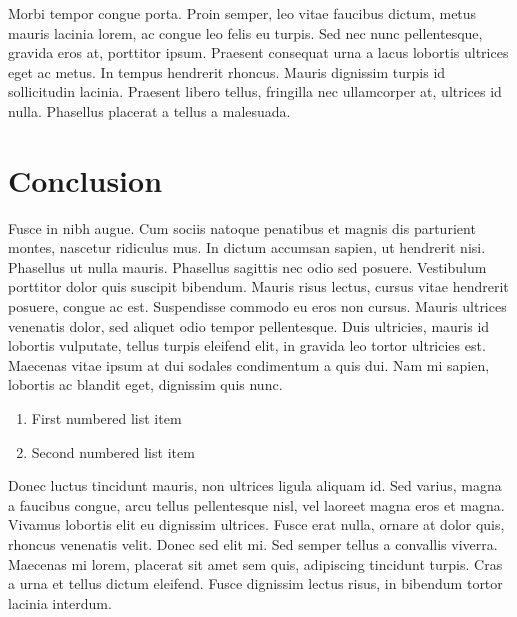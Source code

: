 \documentclass[a4paper,11pt]{article}
\begin{document}
Morbi tempor congue porta. Proin semper, leo vitae faucibus dictum, metus mauris lacinia lorem, ac congue leo felis eu turpis. Sed nec nunc pellentesque, gravida eros at, porttitor ipsum. Praesent consequat urna a lacus lobortis ultrices eget ac metus. In tempus hendrerit rhoncus. Mauris dignissim turpis id sollicitudin lacinia. Praesent libero tellus, fringilla nec ullamcorper at, ultrices id nulla. Phasellus placerat a tellus a malesuada.


\section*{Conclusion}

Fusce in nibh augue. Cum sociis natoque penatibus et magnis dis parturient montes, nascetur ridiculus mus. In dictum accumsan sapien, ut hendrerit nisi. Phasellus ut nulla mauris. Phasellus sagittis nec odio sed posuere. Vestibulum porttitor dolor quis suscipit bibendum. Mauris risus lectus, cursus vitae hendrerit posuere, congue ac est. Suspendisse commodo eu eros non cursus. Mauris ultrices venenatis dolor, sed aliquet odio tempor pellentesque. Duis ultricies, mauris id lobortis vulputate, tellus turpis eleifend elit, in gravida leo tortor ultricies est. Maecenas vitae ipsum at dui sodales condimentum a quis dui. Nam mi sapien, lobortis ac blandit eget, dignissim quis nunc.

\begin{enumerate}
\item First numbered list item
\item Second numbered list item
\end{enumerate}

Donec luctus tincidunt mauris, non ultrices ligula aliquam id. Sed varius, magna a faucibus congue, arcu tellus pellentesque nisl, vel laoreet magna eros et magna. Vivamus lobortis elit eu dignissim ultrices. Fusce erat nulla, ornare at dolor quis, rhoncus venenatis velit. Donec sed elit mi. Sed semper tellus a convallis viverra. Maecenas mi lorem, placerat sit amet sem quis, adipiscing tincidunt turpis. Cras a urna et tellus dictum eleifend. Fusce dignissim lectus risus, in bibendum tortor lacinia interdum.






\end{document}
